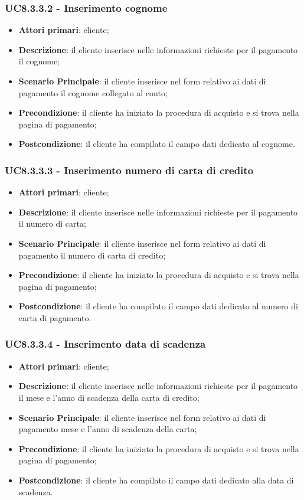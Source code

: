 \subsubsection{UC8.3.3.2 - Inserimento cognome}
\begin{itemize}
\item \textbf{Attori primari}: cliente;
\item \textbf{Descrizione}: il cliente inserisce nelle informazioni richieste per il pagamento il cognome;
\item \textbf{Scenario Principale}: il cliente inserisce nel form relativo ai dati di pagamento il cognome collegato al conto;
\item \textbf{Precondizione}: il cliente ha iniziato la procedura di acquisto e si trova nella pagina di pagamento;
\item \textbf{Postcondizione}: il cliente ha compilato il campo dati dedicato al cognome.
\end{itemize}

\subsubsection{UC8.3.3.3 - Inserimento numero di carta di credito}
\begin{itemize}
\item \textbf{Attori primari}: cliente;
\item \textbf{Descrizione}: il cliente inserisce nelle informazioni richieste per il pagamento il numero di carta;
\item \textbf{Scenario Principale}: il cliente inserisce nel form relativo ai dati di pagamento il numero di carta di credito;
\item \textbf{Precondizione}: il cliente ha iniziato la procedura di acquisto e si trova nella pagina di pagamento;
\item \textbf{Postcondizione}: il cliente ha compilato il campo dati dedicato al numero di carta di pagamento.
\end{itemize}

\subsubsection{UC8.3.3.4 - Inserimento data di scadenza}
\begin{itemize}
\item \textbf{Attori primari}: cliente;
\item \textbf{Descrizione}: il cliente inserisce nelle informazioni richieste per il pagamento il mese e l'anno di scadenza della carta di credito;
\item \textbf{Scenario Principale}: il cliente inserisce nel form relativo ai dati di pagamento mese e l'anno di scadenza della carta;
\item \textbf{Precondizione}: il cliente ha iniziato la procedura di acquisto e si trova nella pagina di pagamento;
\item \textbf{Postcondizione}: il cliente ha compilato il campo dati dedicato alla data di scadenza.
\end{itemize}

